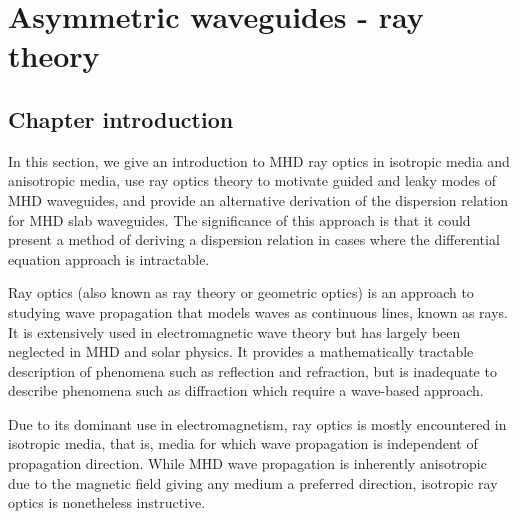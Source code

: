 \documentclass[12pt]{../style-files/ociamthesis}
\begin{document}
\baselineskip=18pt

\setcounter{secnumdepth}{3}
\setcounter{tocdepth}{3}

\setcounter{chapter}{2}

\newcommand{\figdir}{../main/figures/chpt-3/} %

\newcommand{\bv}{\mathbf{v}}
\newcommand{\bB}{\mathbf{B}}

\chapter{Asymmetric waveguides - ray theory}
\label{chap: ray}

\section{Chapter introduction}
\label{sec: ray intro}

	In this section, we give an introduction to MHD ray optics in isotropic media and anisotropic media, use ray optics theory to motivate guided and leaky modes of MHD waveguides, and provide an alternative derivation of the dispersion relation for MHD slab waveguides. The significance of this approach is that it could present a method of deriving a dispersion relation in cases where the differential equation approach is intractable.
	
	Ray optics (also known as ray theory or geometric optics) is an approach to studying wave propagation that models waves as continuous lines, known as rays. It is extensively used in electromagnetic wave theory but has largely been neglected in MHD and solar physics. It provides a mathematically tractable description of phenomena such as reflection and refraction, but is inadequate to describe phenomena such as diffraction which require a wave-based approach.
	
	Due to its dominant use in electromagnetism, ray optics is mostly encountered in isotropic media, that is, media for which wave propagation is independent of propagation direction. While MHD wave propagation is inherently anisotropic due to the magnetic field giving any medium a preferred direction, isotropic ray optics is nonetheless instructive.
	
\end{document}
